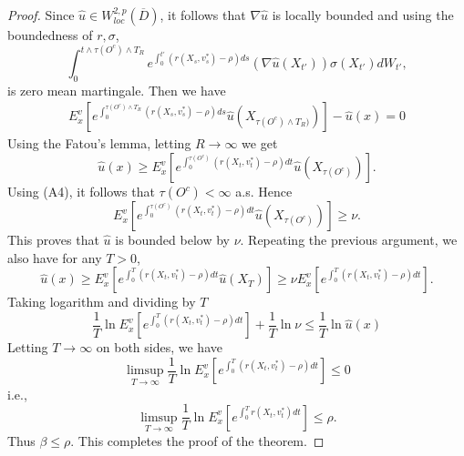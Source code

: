 \documentclass[11pt]{amsart}
\numberwithin{equation}{section}
\begin{document}
\begin{proof}
Since $\hat u \in  W^{2,p}_{loc}(\overline{D})$, %
it follows that $\nabla \hat u$ is locally bounded and using the boundedness of $r,\sigma$,  
$$
\int_{0}^{t \wedge \tau(O^c) \wedge  T_R}  e^{\int_{0}^{t'} (r(X_s,v^*_s)-\rho) ds} (\nabla \hat u(X_{t'}))\sigma(X_{t'}) dW_{t'}, $$ is zero mean martingale.
Then we have
\begin{eqnarray*}
E^v_x\left[ e^{\int_{0}^{\tau(O^c) \wedge T_R } (r(X_s,v^*_s)-\rho) ds} \hat u(X_{\tau(O^c) \wedge T_R) })\right] -\hat u(x) = 0 
\end{eqnarray*}
Using the Fatou's lemma, letting $R\longrightarrow\infty$ we get
$$
\hat u (x)\geq E^v_x \left[ e^{\int_{0}^{\tau(O^c)} (r(X_t, v^*_t) -\rho) dt} \hat u(X_{\tau(O^c)})\right]. %
$$
Using (A4), it follows that $\tau(O^c) < \infty$ a.s. Hence
$$
E^v_x \left[ e^{\int_{0}^{\tau(O^c)} (r(X_t, v^*_t) -\rho) dt} \hat u(X_{\tau(O^c)})\right] \geq \nu.
$$
This proves that $\hat u$ is bounded below by $\nu$. Repeating the previous argument, we also have for 
any $T>0$,
$$
\hat u (x)\geq E^v_x \left[ e^{\int_{0}^T (r(X_t, v^*_t) -\rho) dt} \hat u(X_T)\right] \geq \nu 
E^v_x \left[ e^{\int_{0}^T (r(X_t, v^*_t) -\rho) dt} \right] .
$$
Taking logarithm and dividing by $T$ 
$$
\frac{1}{T} \ln E^v_x \left[ e^{\int_{0}^T (r(X_t, v^*_t) -\rho) dt} \right] + \frac{1}{T} \ln \nu  \leq \frac{1}{T} \ln { \hat u (x) }
$$
Letting $T\longrightarrow\infty$ on both sides, we have 
$$
\limsup_{T \longrightarrow \infty} \frac{1}{T} \ln E^v_x \left[ e^{\int_{0}^T (r(X_t, v^*_t) -\rho) dt} \right]  \leq 0
$$
i.e.,
$$
\limsup_{T \longrightarrow \infty} \frac{1}{T} \ln E^v_x \left[ e^{\int_{0}^T r(X_t, v^*_t)  dt} \right]  \leq \rho.
$$
Thus $\beta \leq \rho$. 
This completes the proof of the theorem. \end{proof}




 
\end{document}
